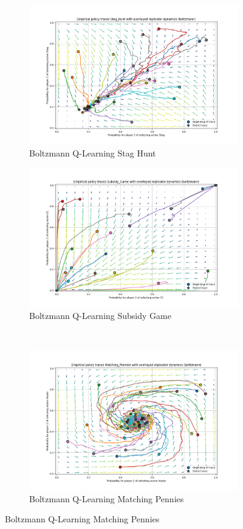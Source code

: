 \documentclass[12pt,letterpaper, onecolumn]{exam}
\begin{document}
\begin{figure}[H]
    \begin{subfigure}{.5\textwidth}
      \centering
      \includegraphics[width=.6\linewidth]{plots/replicator_trajectoreis_Stag_Hunt_boltzmann.png}
      \caption{Boltzmann Q-Learning Stag Hunt}
      \label{fig:sfigbsh}
    \end{subfigure}%
    \begin{subfigure}{.5\textwidth}
      \centering
      \includegraphics[width=.6\linewidth]{plots/replicator_trajectoreis_Subsidy_Game_boltzmann.png}
      \caption{Boltzmann Q-Learning Subsidy Game}
      \label{fig:sfigbsg}
    \end{subfigure}\\
    \begin{subfigure}{.5\textwidth}
      \centering
      \includegraphics[width=.6\linewidth]{plots/replicator_trajectoreis_Matching_Pennies_boltzmann.png}
      \caption{Boltzmann Q-Learning Matching Pennies}

\end{subfigure}
\end{figure}
\end{document}
